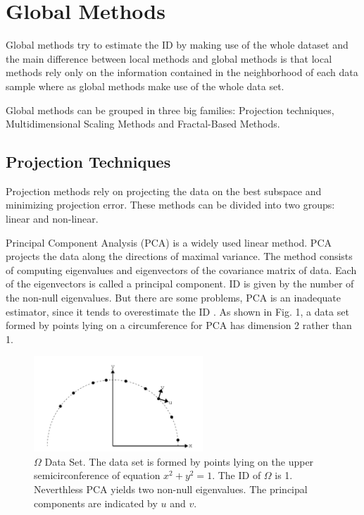 \documentclass[journal]{IEEEtran}
\begin{document}
\section{Global Methods}

Global methods try to estimate the ID by making use of the whole dataset and the main difference between local methods and global methods 
is that local methods rely only on the information contained in the neighborhood of each data sample where as global methods make use of the whole data set.

Global methods can be grouped in three big families: Projection techniques, 
Multidimensional Scaling Methods and Fractal-Based Methods.

\subsection{Projection Techniques}

Projection methods rely on projecting the data on the best subspace and minimizing projection error. These methods can be divided into two groups:
linear and non-linear.

Principal Component Analysis (PCA) \cite{Kirby01, Jollife86} is a widely used linear method. 
PCA projects the data along the directions of maximal variance. The method
consists of computing eigenvalues and eigenvectors of the covariance matrix of
data. Each of the eigenvectors is called a principal component.  ID is given by
the number of the non-null eigenvalues. But there are some problems, PCA is an inadequate estimator, since it tends to overestimate the ID \cite{Bishop95}.
As shown in Fig. 1, a data set formed by points lying on a circumference for PCA has dimension 2 rather than 1.


\begin{figure}[!t]
  \centering
  \includegraphics[width=2.5in]{fig-1.png}
  \caption{\(\Omega\) Data Set. The data set is formed by points lying on the upper semicirconference 
  of equation \(x^2 + y^2 = 1\). The ID of \(\Omega\)  is 1. Neverthless PCA yields two
  non-null eigenvalues. The principal components are indicated by \(u\) and \(v\).}
  \label{fig_sim}
\end{figure}
\end{document}
